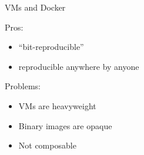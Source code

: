 \documentclass{beamer}
\begin{document}
\begin{frame}{VMs and Docker}


  \Large{
    Pros:
    \begin{itemize}
    \item ``bit-reproducible''

    \item reproducible anywhere by anyone
    \end{itemize}
  }

  \Large{
    Problems:
    \begin{itemize}
    \item VMs are heavyweight


    \item Binary images are opaque



    \item Not composable
    \end{itemize}
  }
\end{frame}
\end{document}
